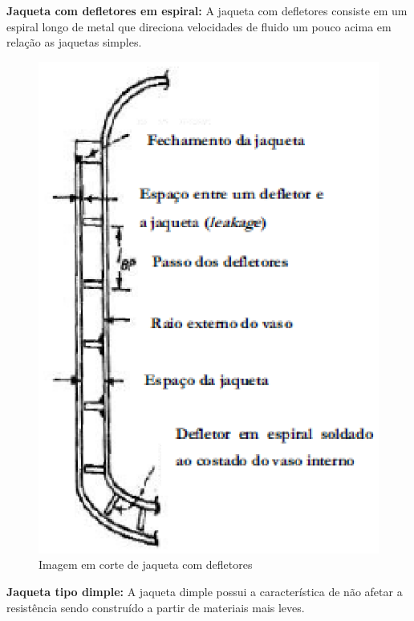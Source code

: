 \textbf{Jaqueta com defletores em espiral:} A jaqueta com defletores consiste em um espiral longo de metal que direciona velocidades de fluido um pouco acima em relação as jaquetas simples.

\begin{figure}[h]
	\centering
	\includegraphics[keepaspectratio=true,scale=0.6]{figuras/jaqueta2.eps}
	\caption{Imagem em corte de jaqueta com defletores\cite{silveira2009analise}}
	\label{jaqueta2}
\end{figure}

\textbf{Jaqueta tipo dimple:} A jaqueta dimple possui a característica de não afetar a resistência sendo construído a partir de materiais mais leves.

